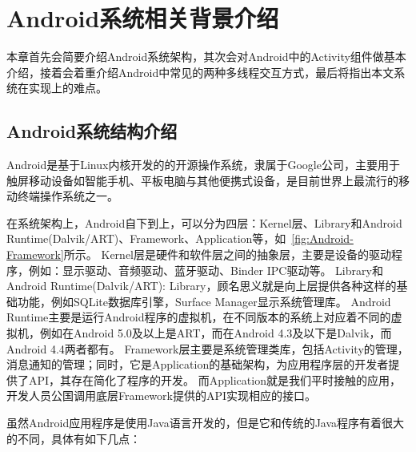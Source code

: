 \chapter{Android系统相关背景介绍 }  
\label{chp:background}


本章首先会简要介绍Android系统架构，其次会对Android中的Activity组件做基本介绍，接着会着重介绍Android中常见的两种多线程交互方式，最后将指出本文系统在实现上的难点。

\section{Android系统结构介绍}

Android是基于Linux内核开发的的开源操作系统，隶属于Google公司，主要用于触屏移动设备如智能手机、平板电脑与其他便携式设备，是目前世界上最流行的移动终端操作系统之一。

在系统架构上，Android自下到上，可以分为四层：Kernel层、Library和Android Runtime(Dalvik/ART)、Framework、Application等，如~\autoref{fig:Android-Framework}所示。
Kernel层是硬件和软件层之间的抽象层，主要是设备的驱动程序，例如：显示驱动、音频驱动、蓝牙驱动、Binder IPC驱动等。
Library和Android Runtime(Dalvik/ART): Library，顾名思义就是向上层提供各种这样的基础功能，例如SQLite数据库引擎，Surface Manager显示系统管理库。
Android Runtime主要是运行Android程序的虚拟机，在不同版本的系统上对应着不同的虚拟机，例如在Android 5.0及以上是ART，而在Android 4.3及以下是Dalvik，而Android 4.4两者都有。
Framework层主要是系统管理类库，包括Activity的管理，消息通知的管理；同时，它是Application的基础架构，为应用程序层的开发者提供了API，其存在简化了程序的开发。
而Application就是我们平时接触的应用，开发人员公国调用底层Framework提供的API实现相应的接口。

虽然Android应用程序是使用Java语言开发的，但是它和传统的Java程序有着很大的不同，具体有如下几点：


